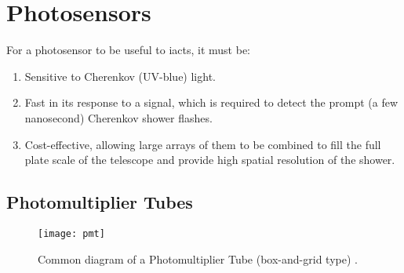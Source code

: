 \section{Photosensors}

For a photosensor to be useful to \glspl{iact}, it must be:
\begin{enumerate}
\item Sensitive to Cherenkov (UV-blue) light.
\item Fast in its response to a signal, which is required to detect the prompt (a few nanosecond) Cherenkov shower flashes.
\item Cost-effective, allowing large arrays of them to be combined to fill the full plate scale of the telescope and provide high spatial resolution of the shower.
\end{enumerate}

\subsection{Photomultiplier Tubes}

\begin{figure}
	\centering
    \texttt{[image: pmt]} 
	\caption[Diagram of a Photomultiplier Tube.]{Common diagram of a Photomultiplier Tube (box-and-grid type) \cite{Hamamatsu2016}.}
	\label{fig:pmt}
\end{figure}


